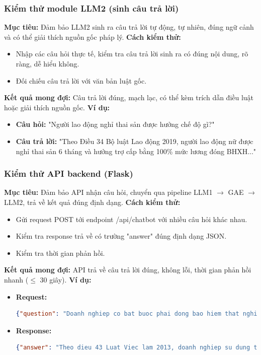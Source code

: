 \documentclass[a4paper]{article}
\begin{document}
\subsubsection{Kiểm thử module LLM2 (sinh câu trả lời)}
\textbf{Mục tiêu:} Đảm bảo LLM2 sinh ra câu trả lời tự động, tự nhiên, đúng ngữ cảnh và có thể giải thích nguồn gốc pháp lý.
\textbf{Cách kiểm thử:}
\begin{itemize}
\item Nhập các câu hỏi thực tế, kiểm tra câu trả lời sinh ra có đúng nội dung, rõ ràng, dễ hiểu không.
\item Đối chiếu câu trả lời với văn bản luật gốc.
\end{itemize}
\textbf{Kết quả mong đợi:} Câu trả lời đúng, mạch lạc, có thể kèm trích dẫn điều luật hoặc giải thích nguồn gốc.
\textbf{Ví dụ:}
\begin{itemize}
\item \textbf{Câu hỏi:} "Người lao động nghỉ thai sản được hưởng chế độ gì?"
\item \textbf{Câu trả lời:} "Theo Điều 34 Bộ luật Lao động 2019, người lao động nữ được nghỉ thai sản 6 tháng và hưởng trợ cấp bằng 100\% mức lương đóng BHXH..."
\end{itemize}
\subsubsection{Kiểm thử API backend (Flask)}
\textbf{Mục tiêu:} Đảm bảo API nhận câu hỏi, chuyển qua pipeline LLM1 $\rightarrow$ GAE $\rightarrow$ LLM2, trả về kết quả đúng định dạng.
\textbf{Cách kiểm thử:}
\begin{itemize}
\item Gửi request POST tới endpoint /api/chatbot với nhiều câu hỏi khác nhau.
\item Kiểm tra response trả về có trường "answer" đúng định dạng JSON.
\item Kiểm tra thời gian phản hồi.
\end{itemize}
\textbf{Kết quả mong đợi:} API trả về câu trả lời đúng, không lỗi, thời gian phản hồi nhanh ($\leq$ 30 giây).
\textbf{Ví dụ:}
\begin{itemize}
\item \textbf{Request:}
\begin{lstlisting}[language=json]
{"question": "Doanh nghiep co bat buoc phai dong bao hiem that nghiep khong?"}
\end{lstlisting}
\item \textbf{Response:}
\begin{lstlisting}[language=json]
{"answer": "Theo dieu 43 Luat Viec lam 2013, doanh nghiep su dung tu 10 lao dong tro len bat buoc phai tham gia bao hiem that nghiep..."}
\end{lstlisting}
\end{itemize}
\end{document}
